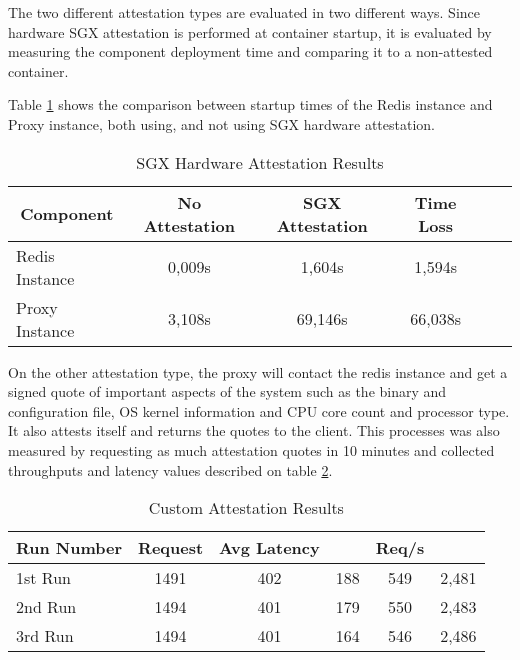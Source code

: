 The two different attestation types are evaluated in two different ways. Since hardware \gls{SGX} attestation is performed at container startup, it is evaluated by measuring the component deployment time and comparing it to a non-attested container.

Table \ref{tab:sgx_attestation_results} shows the comparison between startup times of the Redis instance and Proxy instance, both using, and not using \gls{SGX} hardware attestation.

\begin{table}[ht]
	\caption{SGX Hardware Attestation Results}
	\label{tab:sgx_attestation_results}
\centering
\begin{tabular}{lccccc}
	\toprule
	\multicolumn{1}{c}{\textbf{Component}} & \textbf{No Attestation} & \textbf{SGX Attestation} & \textbf{Time Loss} \\
	\midrule
		Redis Instance & 0,009s & 1,604s & 1,594s 	\\
		Proxy Instance & 3,108s & 69,146s & 66,038s 	\\
	\bottomrule
\end{tabular}
\end{table}

On the other attestation type, the proxy will contact the redis instance and get a signed quote of important aspects of the system such as the binary and configuration file, \gls{OS} kernel information and \gls{CPU} core count and processor type. It also attests itself and returns the quotes to the client. This processes was also measured by requesting as much attestation quotes in 10 minutes and collected throughputs and latency values described on table \ref{tab:custom_attestation_results}.

\begin{table}[ht]
	\caption{Custom Attestation Results}
	\label{tab:custom_attestation_results}
\centering
\begin{tabular}{lccccc}
	\toprule
	\multicolumn{1}{c}{\textbf{Run Number}} & \pmb{\#}\textbf{Request} & \textbf{Avg Latency} & \pmb{\ensuremath{\sigma}} & \textbf{Req/s} \\
	\midrule
		1st Run & 1491 & 402 & 188	 & 549 & 2,481 \\
		2nd Run & 1494 & 401 & 179	 & 550 & 2,483 \\
		3rd Run & 1494 & 401 & 164 & 546 & 2,486 \\
	\bottomrule
\end{tabular}
\end{table}

